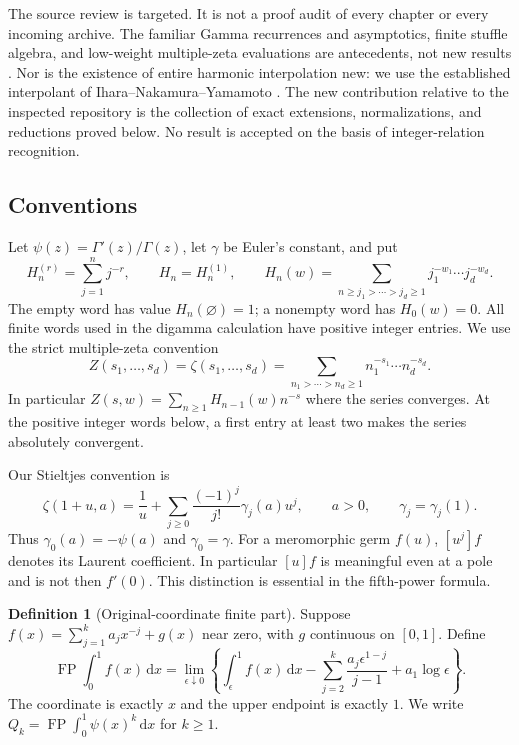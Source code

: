 \documentclass[11pt,a4paper]{article}
\numberwithin{equation}{section}
\theoremstyle{definition}
\newtheorem{definition}[theorem]{Definition}
\theoremstyle{remark}
\DeclareMathOperator{\FP}{FP}
\newcommand{\dd}{\mathrm d}
\begin{document}
The source review is targeted.  It is not a proof audit of every chapter
or every incoming archive.  The familiar Gamma recurrences and
asymptotics, finite stuffle algebra, and low-weight multiple-zeta
evaluations are antecedents, not new results \cite{DLMF,IKZ}.  Nor is the
existence of entire harmonic interpolation new: we use the established
interpolant of Ihara--Nakamura--Yamamoto \cite{INY}.  The new contribution
relative to the inspected repository is the collection of exact
extensions, normalizations, and reductions proved below.  No result is
accepted on the basis of integer-relation recognition.

\subsection{Conventions}

Let $\psi(z)=\Gamma'(z)/\Gamma(z)$, let $\gamma$ be Euler's constant,
and put
\[
 H_n^{(r)}=\sum_{j=1}^n j^{-r},\qquad H_n=H_n^{(1)},\qquad
 H_n(w)=\sum_{n\ge j_1>\cdots>j_d\ge1}
                     j_1^{-w_1}\cdots j_d^{-w_d}.
\]
The empty word has value $H_n(\varnothing)=1$; a nonempty word has
$H_0(w)=0$.  All finite words used in the digamma calculation have
positive integer entries.  We use the strict multiple-zeta convention
\begin{equation}
 Z(s_1,\ldots,s_d)=\zeta(s_1,\ldots,s_d)
 =\sum_{n_1>\cdots>n_d\ge1}
                 n_1^{-s_1}\cdots n_d^{-s_d}.
 \label{eq:strict-zeta}
\end{equation}
In particular $Z(s,w)=\sum_{n\ge1}H_{n-1}(w)n^{-s}$ where the series
converges.  At the positive integer words below, a first entry at least
two makes the series absolutely convergent.

Our Stieltjes convention is
\begin{equation}
 \zeta(1+u,a)=\frac1u+
       \sum_{j\ge0}\frac{(-1)^j}{j!}\gamma_j(a)u^j,
 \qquad a>0,\qquad \gamma_j=\gamma_j(1).
 \label{eq:stieltjes-convention}
\end{equation}
Thus $\gamma_0(a)=-\psi(a)$ and $\gamma_0=\gamma$.
For a meromorphic germ $f(u)$, $[u^j]f$ denotes its Laurent coefficient.
In particular $[u]f$ is meaningful even at a pole and is not then
$f'(0)$.  This distinction is essential in the fifth-power formula.

\begin{definition}[Original-coordinate finite part]
Suppose $f(x)=\sum_{j=1}^k a_jx^{-j}+g(x)$ near zero, with $g$
continuous on $[0,1]$.  Define
\begin{equation}
 \FP\int_0^1 f(x)\,\dd x
 =\lim_{\epsilon\downarrow0}\left\{
 \int_\epsilon^1 f(x)\,\dd x
 -\sum_{j=2}^k\frac{a_j\epsilon^{1-j}}{j-1}
 +a_1\log\epsilon\right\}.
 \label{eq:fp-definition}
\end{equation}
The coordinate is exactly $x$ and the upper endpoint is exactly $1$.
We write $Q_k=\FP\int_0^1\psi(x)^k\,\dd x$ for $k\ge1$.
\end{definition}
\end{document}
